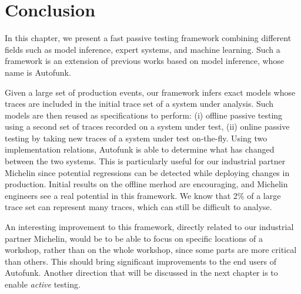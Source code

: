 \section{Conclusion}
\label{sec:testing:conclusion}

In this chapter, we present a fast passive testing framework
combining different fields such as model inference, expert
systems, and machine learning. Such a framework is an extension
of previous works based on model inference, whose name is
Autofunk.

Given a large set of production events, our framework infers
exact models whose traces are included in the initial trace set
of a system under analysis. Such models are then reused as
specifications to perform: (i) offline passive testing using a
second set of traces recorded on a system under test, (ii) online
passive testing by taking new traces of a system under test
on-the-fly.
Using two implementation relations, Autofunk is able to determine
what has changed between the two systems. This is particularly
useful for our industrial partner Michelin since potential
regressions can be detected while deploying changes in
production. Initial results on the offline merhod are
encouraging, and Michelin engineers see a real potential in this
framework. We know that 2\% of a large trace set can represent
many traces, which can still be difficult to analyse.

An interesting improvement to this framework, directly related to
our industrial partner Michelin, would be to be able to focus on
specific locations of a workshop, rather than on the whole
workshop, since some parts are more critical than others. This
should bring significant improvements to the end users of
Autofunk. Another direction that will be discussed in the next
chapter is to enable \textit{active} testing.
